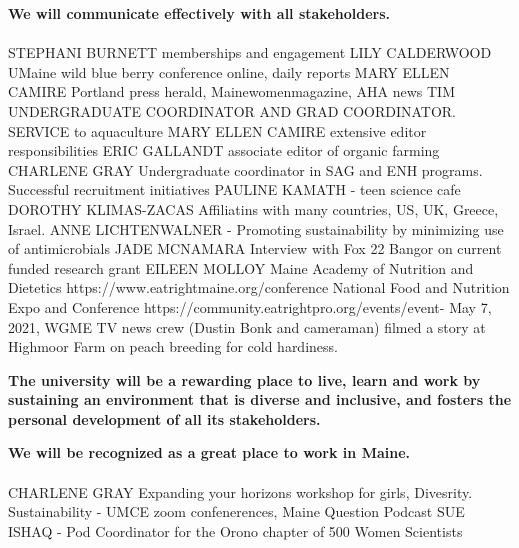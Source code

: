 \documentclass[11pt]{article}
\begin{document}
\begin{description}[topsep=0pt, noitemsep]
\begin{description}[topsep=11pt, noitemsep]
\item[\textbf{2.3}] \textbf{We will communicate effectively with all stakeholders.}\\~\\
	STEPHANI BURNETT memberships and engagement
	LILY CALDERWOOD UMaine wild blue berry conference online, daily reports
	MARY ELLEN CAMIRE Portland press herald, Mainewomenmagazine, AHA news
TIM UNDERGRADUATE COORDINATOR AND GRAD COORDINATOR. SERVICE to aquaculture
MARY ELLEN CAMIRE extensive editor responsibilities 
ERIC GALLANDT associate editor of organic farming 
CHARLENE GRAY  Undergraduate coordinator in SAG and ENH programs. Successful recruitment initiatives
PAULINE KAMATH - teen science cafe
	DOROTHY KLIMAS-ZACAS Affiliatins with many countries, US, UK, Greece, Israel.
ANNE LICHTENWALNER - Promoting sustainability by minimizing use of antimicrobials
JADE MCNAMARA Interview with Fox 22 Bangor on current funded research grant 
EILEEN MOLLOY Maine Academy of Nutrition and Dietetics
https://www.eatrightmaine.org/conference
National Food and Nutrition Expo and Conference
https://community.eatrightpro.org/events/event-
May 7, 2021, WGME TV news crew (Dustin Bonk and cameraman) filmed a story at Highmoor Farm on peach breeding for cold hardiness.
\end{description}
\item[\textbf{3.}] \textbf{The university will be a rewarding place to live, learn and work by sustaining an environment that is diverse and inclusive, and fosters the personal development of all its stakeholders.}
\begin{description}[topsep=11pt, noitemsep]
\item[\textbf{3.1}] \textbf{We will be recognized as a great place to work in Maine.}\\~\\
	CHARLENE GRAY Expanding your horizons workshop for girls, Divesrity. Sustainability - UMCE zoom confenerences, Maine Question Podcast
	SUE ISHAQ - Pod Coordinator for the Orono chapter of 500 Women Scientists

\end{description}
\end{description}
\end{document}
